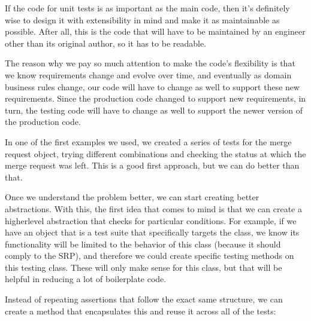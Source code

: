 \documentclass[a4paper,10pt,english]{sphinxmanual}
\begin{document}
If the code for unit tests is as important as the main code, then it’s definitely wise to design
it with extensibility in mind and make it as maintainable as possible. After all, this is the
code that will have to be maintained by an engineer other than its original author, so it has
to be readable.

The reason why we pay so much attention to make the code’s flexibility is that we know
requirements change and evolve over time, and eventually as domain business rules
change, our code will have to change as well to support these new requirements. Since the
production code changed to support new requirements, in turn, the testing code will have
to change as well to support the newer version of the production code.

In one of the first examples we used, we created a series of tests for the merge request
object, trying different combinations and checking the status at which the merge request
was left. This is a good first approach, but we can do better than that.

Once we understand the problem better, we can start creating better abstractions. With this,
the first idea that comes to mind is that we can create a higher\sphinxhyphen{}level abstraction that checks
for particular conditions. For example, if we have an object that is a test suite that
specifically targets the  class, we know its functionality will be limited to the
behavior of this class (because it should comply to the SRP), and therefore we could create
specific testing methods on this testing class. These will only make sense for this class, but
that will be helpful in reducing a lot of boilerplate code.

Instead of repeating assertions that follow the exact same structure, we can create a method
that encapsulates this and reuse it across all of the tests:
\end{document}
